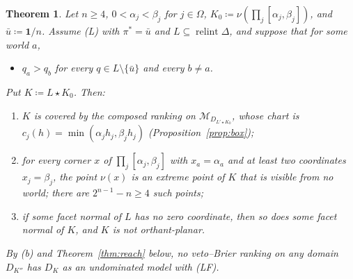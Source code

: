 \documentclass[11pt]{article}
\newcommand{\one}{\mathbf{1}}
\newcommand{\M}{\mathcal{M}}
\newcommand{\ub}{\bar u}
\DeclareMathOperator{\relint}{relint}
\theoremstyle{plain}
\newtheorem{theorem}{Theorem}[section]
\theoremstyle{definition}
\theoremstyle{remark}
\begin{document}
\begin{theorem}\label{thm:F}
Let $n\ge4$, $0<\alpha_j<\beta_j$ for $j\in\Omega$, $K_0\coloneqq\nu(\prod_j[\alpha_j,
\beta_j])$, and $\ub\coloneqq\one/n$. Assume (L) with $\pi^\ast=\ub$ and $L\subseteq\relint
\Delta$, and suppose that for some world $a$,
\begin{itemize}
  \item[(F)] $q_a>q_b$ for every $q\in L\setminus\{\ub\}$ and every $b\ne a$.
\end{itemize}
Put $K\coloneqq L\star K_0$. Then:
\begin{enumerate}[label=(\alph*)]
  \item $K$ is covered by the composed ranking on $\M_{D_{L'\star K_0}}$, whose chart is
  $c_j(h)=\min(\alpha_jh_j,\beta_jh_j)$ (Proposition~\ref{prop:box});
  \item for every corner $x$ of $\prod_j[\alpha_j,\beta_j]$ with $x_a=\alpha_a$ and at least
  two coordinates $x_j=\beta_j$, the point $\nu(x)$ is an extreme point of $K$ that is
  visible from no world; there are $2^{n-1}-n\ge4$ such points;
  \item if some facet normal of $L$ has no zero coordinate, then so does some facet normal
  of $K$, and $K$ is not orthant-planar.
\end{enumerate}
By (b) and Theorem~\ref{thm:reach} below, no veto--Brier ranking on any domain $D_{K''}$
has $D_K$ as an undominated model with (LF).
\end{theorem}
\end{document}
